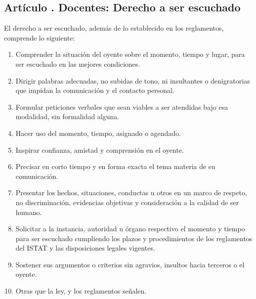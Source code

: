 \subsection{Artículo . Docentes: Derecho a ser escuchado}
\addtocounter{ns}{1}
El derecho a ser escuchado, además de lo establecido en los reglamentos, comprende lo siguiente: 
\begin{enumerate}
\item Comprender la situación del oyente sobre el momento, tiempo y lugar, para ser escuchado en las mejores condiciones. 
\item Dirigir palabras adecuadas, no subidas de tono, ni insultantes o denigratorias que impidan la comunicación y el contacto personal. 
\item Formular peticiones verbales que sean viables a ser atendidas bajo esa modalidad, sin formalidad alguna. 
\item Hacer uso del momento, tiempo, asignado o agendado.  
\item Inspirar confianza, amistad y comprensión en el oyente. 
\item Precisar en corto tiempo y en forma exacta el tema materia de su comunicación. 
\item Presentar los hechos, situaciones, conductas u otros en un marco de respeto, no discriminación, evidencias objetivas y consideración a la calidad de ser humano. 
\item Solicitar a la instancia, autoridad u órgano respectivo el momento y tiempo para ser escuchado cumpliendo los plazos y procedimientos de los reglamentos del ISTAT y las disposiciones legales vigentes. 
\item Sostener sus argumentos o criterios sin agravios, insultos hacia terceros o el oyente. 
\item Otras que la ley, y los reglamentos señalen.
\end{enumerate}
